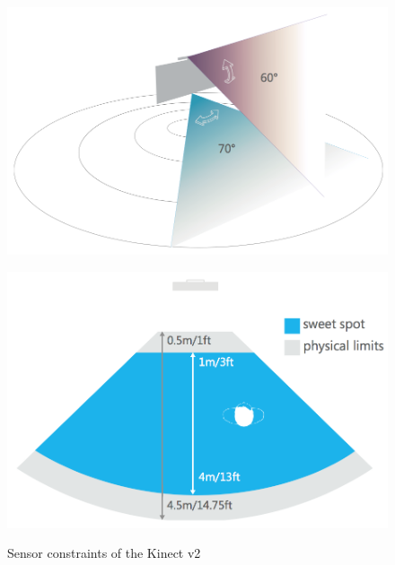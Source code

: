 \begin{figure}[htb]
	\centering
	\begin{minipage}[t]{0.44\linewidth}
		\centering
		\includegraphics[width=1\linewidth]{Pictures/5_1_1_visionAngle}
		\label{fig:5_1_1_visionAngle}
	\end{minipage}
	\hfill
	\begin{minipage}[t]{0.44\linewidth}
		\centering
		\includegraphics[width=1\linewidth]{Pictures/5_1_1_trackingRange}
		\label{fig:5_1_1_trackingRange}
	\end{minipage}
	\caption{Sensor constraints of the Kinect v2~\cite{MicrosoftHIG2014-mh}}
	\label{fig:5_1_1_sensorConstraints}
\end{figure}


